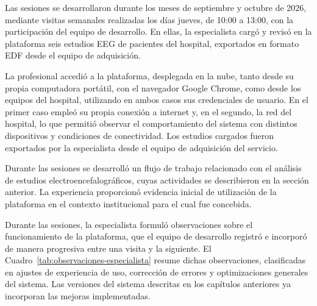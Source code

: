 Las sesiones se desarrollaron durante los meses de septiembre y octubre de 2026, mediante visitas semanales realizadas los días jueves, de 10:00 a 13:00, con la participación del equipo de desarrollo.
En ellas, la especialista cargó y revisó en la plataforma seis estudios EEG de pacientes del hospital, exportados en formato EDF desde el equipo de adquisición.

La profesional accedió a la plataforma, desplegada en la nube, tanto desde su propia computadora portátil, con el navegador Google Chrome, como desde los equipos del hospital, utilizando en ambos casos sus credenciales de usuario.
En el primer caso empleó su propia conexión a internet y, en el segundo, la red del hospital, lo que permitió observar el comportamiento del sistema con distintos dispositivos y condiciones de conectividad.
Los estudios cargados fueron exportados por la especialista desde el equipo de adquisición del servicio.

Durante las sesiones se desarrolló un flujo de trabajo relacionado con el análisis de estudios electroencefalográficos, cuyas actividades se describieron en la sección anterior. La experiencia proporcionó evidencia inicial de utilización de la plataforma en el contexto institucional para el cual fue concebida.

Durante las sesiones, la especialista formuló observaciones sobre el funcionamiento de la plataforma, que el equipo de desarrollo registró e incorporó de manera progresiva entre una visita y la siguiente.
El Cuadro~\ref{tab:observaciones-especialista} resume dichas observaciones, clasificadas en ajustes de experiencia de uso, corrección de errores y optimizaciones generales del sistema.
Las versiones del sistema descritas en los capítulos anteriores ya incorporan las mejoras implementadas.

